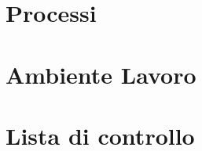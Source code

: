 \newpage
\section{Processi}


\newpage
\section{Ambiente Lavoro}


\newpage
\appendix
\section{Lista di controllo}






